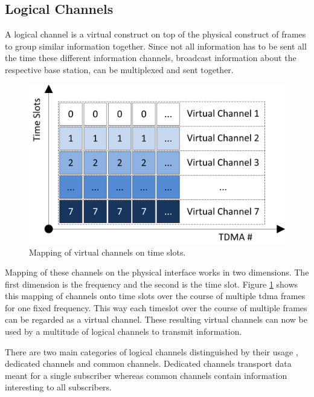 \subsection{Logical Channels}
\label{sec:channels}
A logical channel is a virtual construct on top of the physical construct of frames to group similar information together.
Since not all information has to be sent all the time these different information channels, \eg broadcast information about the respective base station, can be multiplexed and sent together.
\begin{figure}
	\centering
	\includegraphics{../Images/Channels}
	\caption{Mapping of virtual channels on time slots.}
	\label{fig:channels}
\end{figure}

Mapping of these channels on the physical interface works in two dimensions.
The first dimension is the frequency and the second is the time slot.
Figure \ref{fig:channels} shows this mapping of channels onto time slots over the course of multiple \gls{tdma} frames for one fixed frequency.
This way each timeslot over the course of multiple frames can be regarded as a virtual channel.
These resulting virtual channels can now be used by a multitude of logical channels to transmit information.

There are two main categories of logical channels distinguished by their usage \cite{kommsys2006}, dedicated channels and common channels.
Dedicated channels transport data meant for a single subscriber whereas common channels contain information interesting to all subscribers.

